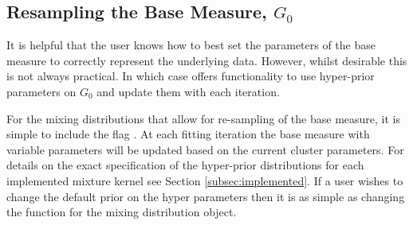 \documentclass[nojss]{jss}
\begin{document}
\subsection{Resampling the Base Measure, $G_0$}
It is helpful that the user knows how to best set the parameters of the base measure to correctly represent the underlying data. However, whilst desirable this is not always practical. In which case  offers functionality to use hyper-prior parameters on $G_0$ and update them with each iteration.

For the mixing distributions that allow for re-sampling of the base measure, it is simple to include the flag . At each fitting iteration the base measure with variable parameters will be updated based on the current cluster parameters. For details on the exact specification of the hyper-prior distributions for each implemented mixture kernel see Section \ref{subsec:implemented}.  If a user wishes to change the default prior on the hyper parameters then it is as simple as changing the  function for the mixing distribution object.



\end{document}
